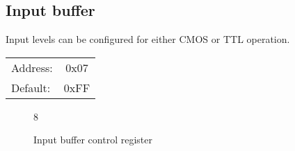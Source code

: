 \documentclass{article}
\begin{document}
	
	\subsection{Input buffer}
	
	Input levels can be configured for either CMOS or TTL operation.
	
	\begin{tabular}{ l c }
		Address: & 0x07 \\
		Default: & 0xFF \\
	\end{tabular}
	
	\begin{figure}[H]
		\centering
		\begin{bytefield}[
			bitwidth=0.1\linewidth]{8}
			 \\
		\end{bytefield}
		\caption{Input buffer control register}
		\label{reg:input_buffer}
	\end{figure}
	
\end{document}
